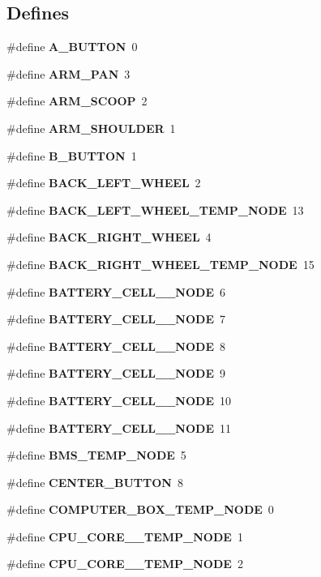 \subsection*{\-Defines}
\begin{DoxyCompactItemize}
\item 
\#define {\bf \-A\-\_\-\-B\-U\-T\-T\-O\-N}~0
\item 
\#define {\bf \-A\-R\-M\-\_\-\-P\-A\-N}~3
\item 
\#define {\bf \-A\-R\-M\-\_\-\-S\-C\-O\-O\-P}~2
\item 
\#define {\bf \-A\-R\-M\-\_\-\-S\-H\-O\-U\-L\-D\-E\-R}~1
\item 
\#define {\bf \-B\-\_\-\-B\-U\-T\-T\-O\-N}~1
\item 
\#define {\bf \-B\-A\-C\-K\-\_\-\-L\-E\-F\-T\-\_\-\-W\-H\-E\-E\-L}~2
\item 
\#define {\bf \-B\-A\-C\-K\-\_\-\-L\-E\-F\-T\-\_\-\-W\-H\-E\-E\-L\-\_\-\-T\-E\-M\-P\-\_\-\-N\-O\-D\-E}~13
\item 
\#define {\bf \-B\-A\-C\-K\-\_\-\-R\-I\-G\-H\-T\-\_\-\-W\-H\-E\-E\-L}~4
\item 
\#define {\bf \-B\-A\-C\-K\-\_\-\-R\-I\-G\-H\-T\-\_\-\-W\-H\-E\-E\-L\-\_\-\-T\-E\-M\-P\-\_\-\-N\-O\-D\-E}~15
\item 
\#define {\bf \-B\-A\-T\-T\-E\-R\-Y\-\_\-\-C\-E\-L\-L\-\_\-\_\-\-N\-O\-D\-E}~6
\item 
\#define {\bf \-B\-A\-T\-T\-E\-R\-Y\-\_\-\-C\-E\-L\-L\-\_\-\_\-\-N\-O\-D\-E}~7
\item 
\#define {\bf \-B\-A\-T\-T\-E\-R\-Y\-\_\-\-C\-E\-L\-L\-\_\-\_\-\-N\-O\-D\-E}~8
\item 
\#define {\bf \-B\-A\-T\-T\-E\-R\-Y\-\_\-\-C\-E\-L\-L\-\_\-\_\-\-N\-O\-D\-E}~9
\item 
\#define {\bf \-B\-A\-T\-T\-E\-R\-Y\-\_\-\-C\-E\-L\-L\-\_\-\_\-\-N\-O\-D\-E}~10
\item 
\#define {\bf \-B\-A\-T\-T\-E\-R\-Y\-\_\-\-C\-E\-L\-L\-\_\-\_\-\-N\-O\-D\-E}~11
\item 
\#define {\bf \-B\-M\-S\-\_\-\-T\-E\-M\-P\-\_\-\-N\-O\-D\-E}~5
\item 
\#define {\bf \-C\-E\-N\-T\-E\-R\-\_\-\-B\-U\-T\-T\-O\-N}~8
\item 
\#define {\bf \-C\-O\-M\-P\-U\-T\-E\-R\-\_\-\-B\-O\-X\-\_\-\-T\-E\-M\-P\-\_\-\-N\-O\-D\-E}~0
\item 
\#define {\bf \-C\-P\-U\-\_\-\-C\-O\-R\-E\-\_\-\_\-\-T\-E\-M\-P\-\_\-\-N\-O\-D\-E}~1
\item 
\#define {\bf \-C\-P\-U\-\_\-\-C\-O\-R\-E\-\_\-\_\-\-T\-E\-M\-P\-\_\-\-N\-O\-D\-E}~2

\end{DoxyCompactItemize}
